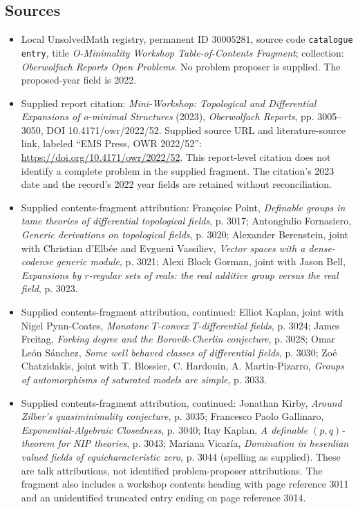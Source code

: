 \documentclass[11pt]{article}
\begin{document}
\subsection{Sources}
\begin{itemize}
\item Local UnsolvedMath registry, permanent ID \(30005281\), source code \texttt{catalogue entry}, title \emph{O-Minimality Workshop Table-of-Contents Fragment}; collection: \emph{Oberwolfach Reports Open Problems}. No problem proposer is supplied. The proposed-year field is 2022.
\item Supplied report citation: \emph{Mini-Workshop: Topological and Differential Expansions of o-minimal Structures} (2023), \emph{Oberwolfach Reports}, pp. 3005--3050, DOI 10.4171/owr/2022/52. Supplied source URL and literature-source link, labeled ``EMS Press, OWR 2022/52'': \url{https://doi.org/10.4171/owr/2022/52}. This report-level citation does not identify a complete problem in the supplied fragment. The citation's 2023 date and the record's 2022 year fields are retained without reconciliation.
\item Supplied contents-fragment attribution: Françoise Point, \emph{Definable groups in tame theories of differential topological fields}, p. 3017; Antongiulio Fornasiero, \emph{Generic derivations on topological fields}, p. 3020; Alexander Berenstein, joint with Christian d'Elbée and Evgueni Vassiliev, \emph{Vector spaces with a dense-codense generic module}, p. 3021; Alexi Block Gorman, joint with Jason Bell, \emph{Expansions by \(r\)-regular sets of reals: the real additive group versus the real field}, p. 3023.
\item Supplied contents-fragment attribution, continued: Elliot Kaplan, joint with Nigel Pynn-Coates, \emph{Monotone \(T\)-convex \(T\)-differential fields}, p. 3024; James Freitag, \emph{Forking degree and the Borovik-Cherlin conjecture}, p. 3028; Omar León Sánchez, \emph{Some well behaved classes of differential fields}, p. 3030; Zoé Chatzidakis, joint with T. Blossier, C. Hardouin, A. Martin-Pizarro, \emph{Groups of automorphisms of saturated models are simple}, p. 3033.
\item Supplied contents-fragment attribution, continued: Jonathan Kirby, \emph{Around Zilber's quasiminimality conjecture}, p. 3035; Francesco Paolo Gallinaro, \emph{Exponential-Algebraic Closedness}, p. 3040; Itay Kaplan, \emph{A definable \((p,q)\)-theorem for NIP theories}, p. 3043; Mariana Vicaría, \emph{Domination in hesenlian valued fields of equicharacteristic zero}, p. 3044 (spelling as supplied). These are talk attributions, not identified problem-proposer attributions. The fragment also includes a workshop contents heading with page reference 3011 and an unidentified truncated entry ending on page reference 3014.

\end{itemize}
\end{document}
